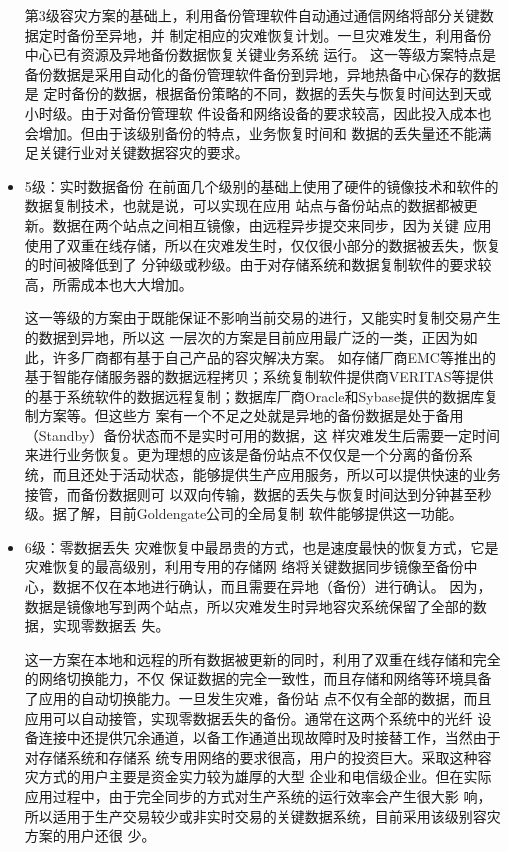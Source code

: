 \documentclass[cyan]{elegantnote}
\begin{document}
\begin{itemize}
第3级容灾方案的基础上，利用备份管理软件自动通过通信网络将部分关键数据定时备份至异地，并
制定相应的灾难恢复计划。一旦灾难发生，利用备份中心已有资源及异地备份数据恢复关键业务系统
运行。
这一等级方案特点是备份数据是采用自动化的备份管理软件备份到异地，异地热备中心保存的数据是
定时备份的数据，根据备份策略的不同，数据的丢失与恢复时间达到天或小时级。由于对备份管理软
件设备和网络设备的要求较高，因此投入成本也会增加。但由于该级别备份的特点，业务恢复时间和
数据的丢失量还不能满足关键行业对关键数据容灾的要求。
    \item 5级：实时数据备份
在前面几个级别的基础上使用了硬件的镜像技术和软件的数据复制技术，也就是说，可以实现在应用
站点与备份站点的数据都被更新。数据在两个站点之间相互镜像，由远程异步提交来同步，因为关键
应用使用了双重在线存储，所以在灾难发生时，仅仅很小部分的数据被丢失，恢复的时间被降低到了
分钟级或秒级。由于对存储系统和数据复制软件的要求较高，所需成本也大大增加。
    
这一等级的方案由于既能保证不影响当前交易的进行，又能实时复制交易产生的数据到异地，所以这
一层次的方案是目前应用最广泛的一类，正因为如此，许多厂商都有基于自己产品的容灾解决方案。
如存储厂商EMC等推出的基于智能存储服务器的数据远程拷贝；系统复制软件提供商VERITAS等提供
的基于系统软件的数据远程复制；数据库厂商Oracle和Sybase提供的数据库复制方案等。但这些方
案有一个不足之处就是异地的备份数据是处于备用（Standby）备份状态而不是实时可用的数据，这
样灾难发生后需要一定时间来进行业务恢复。更为理想的应该是备份站点不仅仅是一个分离的备份系
统，而且还处于活动状态，能够提供生产应用服务，所以可以提供快速的业务接管，而备份数据则可
以双向传输，数据的丢失与恢复时间达到分钟甚至秒级。据了解，目前Goldengate公司的全局复制
软件能够提供这一功能。
    \item 6级：零数据丢失
灾难恢复中最昂贵的方式，也是速度最快的恢复方式，它是灾难恢复的最高级别，利用专用的存储网
络将关键数据同步镜像至备份中心，数据不仅在本地进行确认，而且需要在异地（备份）进行确认。
因为，数据是镜像地写到两个站点，所以灾难发生时异地容灾系统保留了全部的数据，实现零数据丢
失。
     
这一方案在本地和远程的所有数据被更新的同时，利用了双重在线存储和完全的网络切换能力，不仅
保证数据的完全一致性，而且存储和网络等环境具备了应用的自动切换能力。一旦发生灾难，备份站
点不仅有全部的数据，而且应用可以自动接管，实现零数据丢失的备份。通常在这两个系统中的光纤
设备连接中还提供冗余通道，以备工作通道出现故障时及时接替工作，当然由于对存储系统和存储系
统专用网络的要求很高，用户的投资巨大。采取这种容灾方式的用户主要是资金实力较为雄厚的大型
企业和电信级企业。但在实际应用过程中，由于完全同步的方式对生产系统的运行效率会产生很大影
响，所以适用于生产交易较少或非实时交易的关键数据系统，目前采用该级别容灾方案的用户还很
少。
\end{itemize}
\end{document}

